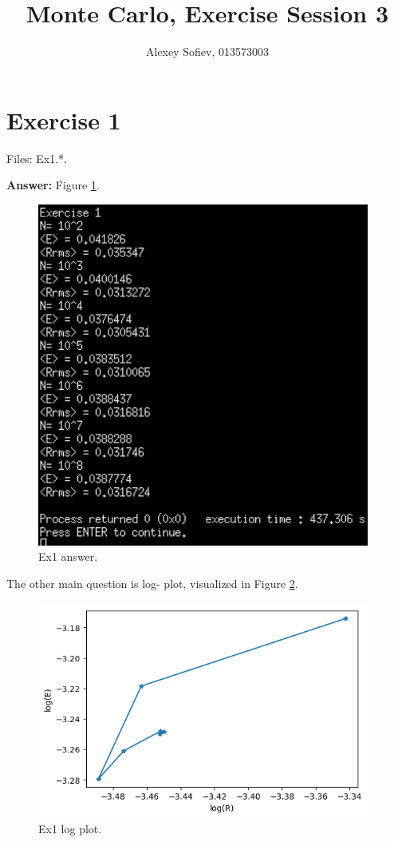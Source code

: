 \documentclass{article}
\begin{document}
\title{Monte Carlo, Exercise Session 3}
\author{Alexey Sofiev, 013573003}

\maketitle


\section{Exercise 1}
Files: Ex1.*. 

\textbf{Answer:} Figure \ref{fig:ex1_answer}.

\begin{figure}[!hbt]
	\centering
	\includegraphics[width=4.3in]{ex1_answer}
	\caption{Ex1 answer.}
	\label{fig:ex1_answer}
\end{figure}

The other main question is log- plot, visualized in Figure \ref{fig:ex1_log}.

\begin{figure}[!hbt]
	\centering
	\includegraphics[width=4.3in]{ex1_log}
	\caption{Ex1 log plot.}
	\label{fig:ex1_log}
\end{figure}
\end{document}
